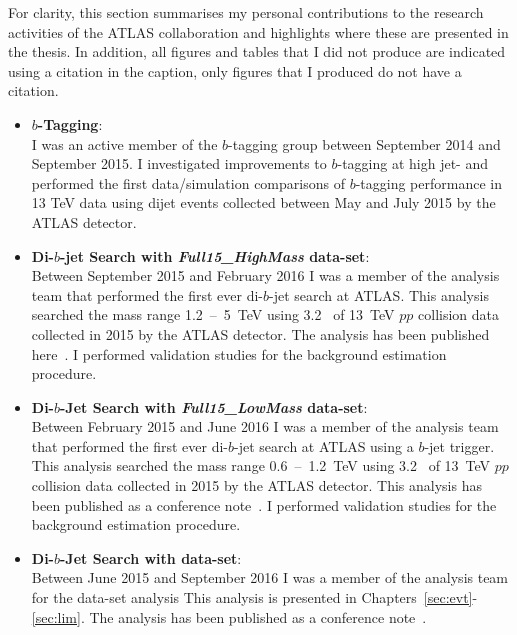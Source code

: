 For clarity, this section summarises my personal contributions to the research activities of the ATLAS collaboration
and highlights where these are presented in the thesis.
In addition, all figures and tables that I did not produce are indicated using a citation in the caption,
only figures that I produced do not have a citation.


\begin{itemize}[leftmargin=*]
\item\textbf{$b$-Tagging}:\\
  I was an active member of the $b$-tagging group between September 2014 and September 2015.
  I investigated improvements to $b$-tagging at high jet-\pT{} and
  performed the first data/simulation comparisons of $b$-tagging performance in 13 TeV data using dijet events collected between May and July 2015 by the ATLAS detector. \vspace{1em}
\item\textbf{Di-$b$-jet Search with \textit{Full15\_HighMass} data-set}:\\
  Between September 2015 and February 2016 I was a member of the analysis team that performed the first ever di-$b$-jet search at ATLAS.
  This analysis searched the mass range 1.2~--~5~TeV using 3.2~\ifb{} of 13~TeV $pp$ collision data collected in 2015 by the ATLAS detector.
  The analysis has been published here~\cite{dibjet-mori16_paper}. 
  I performed validation studies for the background estimation procedure. \vspace{1em}
\item\textbf{Di-$b$-Jet Search  with \textit{Full15\_LowMass} data-set}:\\
  Between February 2015 and June 2016 I was a member of the analysis team that performed the first ever di-$b$-jet search at ATLAS using a $b$-jet trigger.
  This analysis searched the mass range 0.6~--~1.2~TeV using 3.2~\ifb{} of 13~TeV $pp$ collision data collected in 2015 by the ATLAS detector.
  This analysis has been published as a conference note~\cite{dibjet-lhcp_conf}.
  I performed validation studies for the background estimation procedure. \vspace{1em}
    \newpage
\item\textbf{Di-$b$-Jet Search  with \summer{} data-set}:\\ 
  Between June 2015 and September 2016 I was a member of the analysis team for the \summer{} data-set analysis
  This analysis is presented in Chapters~\ref{sec:evt}-\ref{sec:lim}.
  The analysis has been published as a conference note~\cite{dibjet-ichep_conf}. 

\end{itemize}
